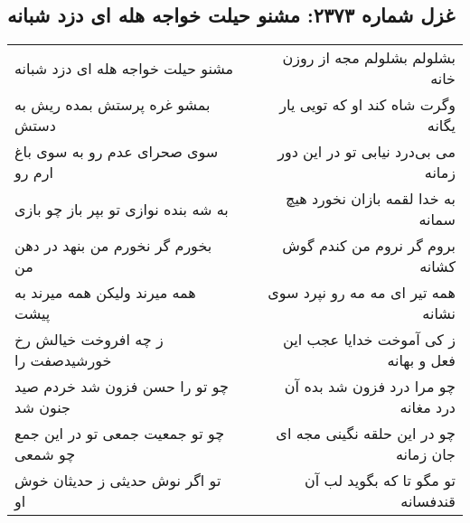 \begin{center}
\section*{غزل شماره ۲۳۷۳: مشنو حیلت خواجه هله ای دزد شبانه}
\label{sec:2373}
\begin{longtable}{l p{0.5cm} r}
مشنو حیلت خواجه هله ای دزد شبانه
&&
بشلولم بشلولم مجه از روزن خانه
\\
بمشو غره پرستش بمده ریش به دستش
&&
وگرت شاه کند او که تویی یار یگانه
\\
سوی صحرای عدم رو به سوی باغ ارم رو
&&
می بی‌درد نیابی تو در این دور زمانه
\\
به شه بنده نوازی تو بپر باز چو بازی
&&
به خدا لقمه بازان نخورد هیچ سمانه
\\
بخورم گر نخورم من بنهد در دهن من
&&
بروم گر نروم من کندم گوش کشانه
\\
همه میرند ولیکن همه میرند به پیشت
&&
همه تیر ای مه مه رو نپرد سوی نشانه
\\
ز چه افروخت خیالش رخ خورشیدصفت را
&&
ز کی آموخت خدایا عجب این فعل و بهانه
\\
چو تو را حسن فزون شد خردم صید جنون شد
&&
چو مرا درد فزون شد بده آن درد مغانه
\\
چو تو جمعیت جمعی تو در این جمع چو شمعی
&&
چو در این حلقه نگینی مجه ای جان زمانه
\\
تو اگر نوش حدیثی ز حدیثان خوش او
&&
تو مگو تا که بگوید لب آن قندفسانه
\\
\end{longtable}
\end{center}
